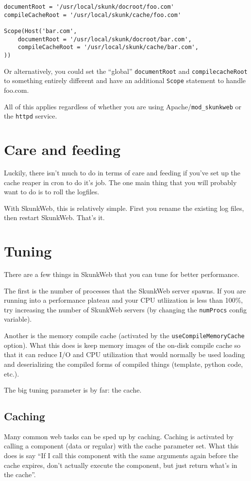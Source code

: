 \documentclass[titlepage]{manual}
\begin{document}
\begin{verbatim}
documentRoot = '/usr/local/skunk/docroot/foo.com'
compileCacheRoot = '/usr/local/skunk/cache/foo.com'

Scope(Host('bar.com',
    documentRoot = '/usr/local/skunk/docroot/bar.com',
    compileCacheRoot = '/usr/local/skunk/cache/bar.com',
))    
\end{verbatim}

Or alternatively, you could set the ``global'' \texttt{documentRoot}
and \texttt{compilecacheRoot} to something entirely different and have
an additional \texttt{Scope} statement to handle foo.com.

All of this applies regardless of whether you are using
Apache/\texttt{mod\_skunkweb} or the \texttt{httpd} service.

\chapter{Care and feeding}
Luckily, there isn't much to do in terms of care and feeding if you've
set up the cache reaper in cron to do it's job.  The one main thing
that you will probably want to do is to roll the logfiles.

With SkunkWeb, this is relatively simple.  First you rename the existing
log files, then restart SkunkWeb.  That's it.

\chapter{Tuning}
There are a few things in SkunkWeb that you can tune for better
performance.  

The first is the number of processes that the SkunkWeb
server spawns.  If you are running into a performance plateau and your
CPU utliization is less than 100\%, try increasing the number of SkunkWeb
servers (by changing the \texttt{numProcs} config variable).

Another is the memory compile cache (activated by the
\texttt{useCompileMemoryCache} option).  What this does is keep memory
images of the on-disk compile cache so that it can reduce I/O and CPU
utilization that would normally be used loading and deserializing the
compiled forms of compiled things (template, python code, etc.).

The big tuning parameter is by far:  the cache.

\section{Caching}
Many common web tasks can be sped up by caching.  Caching is activated
by calling a component (data or regular) with the cache parameter set.
What this does is say ``If I call this component with the same arguments
again before the cache expires, don't actually execute the component, but
just return what's in the cache''.  
\end{document}
